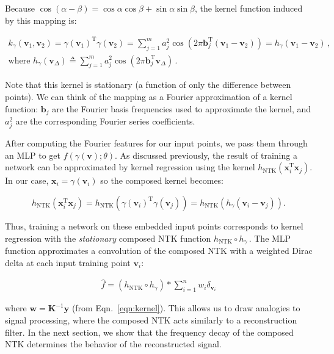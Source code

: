 Because $\cos(\alpha-\beta) = \cos \alpha \cos \beta + \sin \alpha \sin \beta$, the kernel function induced by this mapping is:

\begin{gather}
    k_\gamma(\mathbf{v}_1, \mathbf{v}_2) = \gamma(\mathbf{v}_1)^\mathrm{T} \gamma(\mathbf{v}_2) 
    = \sum_{j=1}^m a_j^2 \cos\left(2 \pi \mathbf b_j^\mathrm{T} \left(\mathbf{v}_1 - \mathbf{v}_2 \right) \right)
    = h_\gamma(\mathbf{v}_1 - \mathbf{v}_2)\,, \\
    \textrm{where } h_\gamma(\mathbf{v}_\Delta) \triangleq \sum_{j=1}^m a_j^2 \cos(2 \pi \mathbf b_j^\mathrm{T} \mathbf{v}_\Delta) \, .
\end{gather}

Note that this kernel is stationary (a function of only the difference between points). We can think of the mapping as a Fourier approximation of a kernel function: $\mathbf b_j$ are the Fourier basis frequencies used to approximate the kernel, and $a_j^2$ are the corresponding Fourier series coefficients. 

After computing the Fourier features for our input points, we pass them through an MLP to get $f(\gamma(\mathbf{v}) ; \theta)$. As discussed previously, the result of training a network can be approximated by kernel regression using the kernel $h_{\mathrm{NTK}}(\mathbf{x}_i^\mathrm{T} \mathbf{x}_j)$. In our case, $\mathbf{x}_i = \gamma(\mathbf{v}_i)$ so the composed kernel becomes:

\begin{equation}
    h_{\mathrm{NTK}}(\mathbf{x}_i^\mathrm{T} \mathbf{x}_j) = h_{\mathrm{NTK}}\left(\gamma\left(\mathbf{v}_i\right)^\mathrm{T} \gamma\left(\mathbf{v}_j\right)\right)  = h_{\mathrm{NTK}} \left(h_\gamma \left(\mathbf{v}_i - \mathbf{v}_j \right) \right).
\end{equation}

Thus, training a network on these embedded input points corresponds to kernel regression with the \emph{stationary} composed NTK function $h_{\mathrm{NTK}} \circ h_\gamma$\,. The MLP function approximates a convolution of the composed NTK with a weighted Dirac delta at each input training point $\mathbf{v}_i$:

\begin{align}
    \hat f = \left( h_{\mathrm{NTK}} \circ h_\gamma \right) * \sum_{i=1}^n w_i \delta_{\mathbf{v}_i}
\end{align}

where $\mathbf w = \mathbf{K}^{-1} \mathbf y$ (from Eqn.~\ref{eqn:kernel}).
This allows us to draw analogies to signal processing, where the composed NTK acts similarly to a reconstruction filter. In the next section, we show that the frequency decay of the composed NTK determines the behavior of the reconstructed signal.

